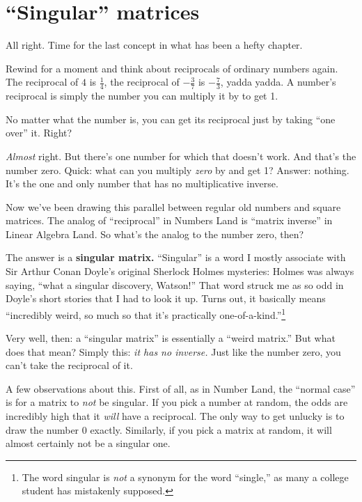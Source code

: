 \section{``Singular'' matrices}


All right. Time for the last concept in what has been a hefty chapter.

Rewind for a moment and think about reciprocals of ordinary numbers again. The
reciprocal of $4$ is $\frac{1}{4}$, the reciprocal of $-\frac{3}{7}$ is
$-\frac{7}{3}$, yadda yadda. A number's reciprocal is simply the number you can
multiply it by to get 1.

No matter what the number is, you can get its reciprocal just by taking ``one
over'' it. Right?


\textit{Almost} right. But there's one number for which that doesn't work. And
that's the number zero. Quick: what can you multiply \textit{zero} by and get
1? Answer: nothing. It's the one and only number that has no multiplicative
inverse.

Now we've been drawing this parallel between regular old numbers and square
matrices. The analog of ``reciprocal'' in Numbers Land is ``matrix inverse'' in
Linear Algebra Land. So what's the analog to the number zero, then?


The answer is a \textbf{singular matrix.} ``Singular'' is a word I mostly
associate with Sir Arthur Conan Doyle's original Sherlock Holmes mysteries:
Holmes was always saying, ``what a singular discovery, Watson!'' That word
struck me as so odd in Doyle's short stories that I had to look it up. Turns
out, it basically means ``incredibly weird, so much so that it's practically
one-of-a-kind.''\footnote{The word singular is \textit{not} a synonym for the
word ``single,'' as many a college student has mistakenly supposed.}

Very well, then: a ``singular matrix'' is essentially a ``weird matrix.'' But
what does that mean? Simply this: \textit{it has no inverse.} Just like the
number zero, you can't take the reciprocal of it.

A few observations about this. First of all, as in Number Land, the ``normal
case'' is for a matrix to \textit{not} be singular. If you pick a number at
random, the odds are incredibly high that it \textit{will} have a reciprocal.
The only way to get unlucky is to draw the number 0 exactly. Similarly, if you
pick a matrix at random, it will almost certainly not be a singular one.


